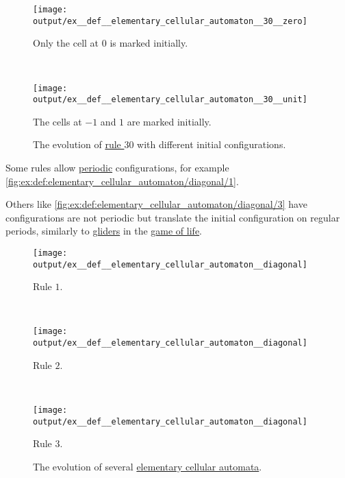 \begin{example}
\begin{thmenum}
    \begin{figure}[!ht]
      \begin{subcaptionblock}{\textwidth}
        \centering
        \texttt{[image: output/ex\_\_def\_\_elementary\_cellular\_automaton\_\_30\_\_zero]}
        \caption{Only the cell at \( 0 \) is marked initially.}\label{fig:ex:def:elementary_cellular_automaton/30/zero}
      \end{subcaptionblock}
      \\[\baselineskip]
      \begin{subcaptionblock}{\textwidth}
        \centering
        \texttt{[image: output/ex\_\_def\_\_elementary\_cellular\_automaton\_\_30\_\_unit]}
        \caption{The cells at \( -1 \) and \( 1 \) are marked initially.}\label{fig:ex:def:elementary_cellular_automaton/30/unit}
      \end{subcaptionblock}
      \caption{The evolution of \hyperref[ex:def:elementary_cellular_automaton/30]{rule \( 30 \)} with different initial configurations.}\label{fig:ex:def:elementary_cellular_automaton/30}
    \end{figure}

     Some rules allow \hyperref[def:dynamical_system_periodicity]{periodic} configurations, for example \cref{fig:ex:def:elementary_cellular_automaton/diagonal/1}.

    Others like \cref{fig:ex:def:elementary_cellular_automaton/diagonal/3} have configurations are not periodic but translate the initial configuration on regular periods, similarly to \hyperref[ex:def:game_of_life/glider]{gliders} in the \hyperref[def:game_of_life]{game of life}.

    \begin{figure}[!ht]
      \begin{subcaptionblock}{\textwidth}
        \centering
        \texttt{[image: output/ex\_\_def\_\_elementary\_cellular\_automaton\_\_diagonal]}
        \caption{Rule \( 1 \).}\label{fig:ex:def:elementary_cellular_automaton/diagonal/1}
      \end{subcaptionblock}
      \\[\baselineskip]
      \begin{subcaptionblock}{\textwidth}
        \centering
        \texttt{[image: output/ex\_\_def\_\_elementary\_cellular\_automaton\_\_diagonal]}
        \caption{Rule \( 2 \).}\label{fig:ex:def:elementary_cellular_automaton/diagonal/2}
      \end{subcaptionblock}
      \\[\baselineskip]
      \begin{subcaptionblock}{\textwidth}
        \centering
        \texttt{[image: output/ex\_\_def\_\_elementary\_cellular\_automaton\_\_diagonal]}
        \caption{Rule \( 3 \).}\label{fig:ex:def:elementary_cellular_automaton/diagonal/3}
      \end{subcaptionblock}
      \caption{The evolution of several \hyperref[def:elementary_cellular_automaton]{elementary cellular automata}.}\label{fig:ex:def:elementary_cellular_automaton/diagonal}
    \end{figure}


\end{thmenum}
\end{example}
